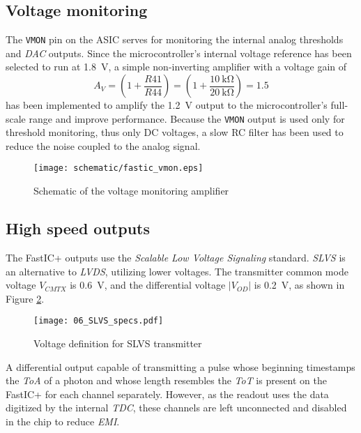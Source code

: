 \subsection{Voltage monitoring}
%
The \verb|VMON| pin on the ASIC serves for monitoring the internal analog thresholds and \emph{DAC} outputs. Since the microcontroller's internal voltage reference has been selected to run at \SI{1.8}{\volt}, a simple non-inverting amplifier with a voltage gain of
%
\begin{equation}
    A_V = \left( 1 + \frac{R41}{R44}\right) = \left( 1 + \frac{\SI{10}{\kilo\ohm}}{\SI{20}{\kilo\ohm}}\right) = 1.5
\end{equation}
%
has been implemented to amplify the \SI{1.2}{\volt} output to the microcontroller's full-scale range and improve performance. Because the \verb|VMON| output is used only for threshold monitoring, thus only DC voltages, a slow RC filter has been used to reduce the noise coupled to the analog signal.
%
\FloatBarrier
\begin{figure}[htp!]
    \centering
    \texttt{[image: schematic/fastic\_vmon.eps]}
    \caption{Schematic of the voltage monitoring amplifier}
    \label{fig:fastic_vmon}
\end{figure}
\FloatBarrier
%
\subsection{High speed outputs}
%
The FastIC+ outputs use the \emph{Scalable Low Voltage Signaling} standard. \emph{SLVS} is an alternative to \emph{LVDS}, utilizing lower voltages. The transmitter common mode voltage $V_{CMTX}$ is \SI{0.6}{\volt}, and the differential voltage $|V_{OD}|$ is \SI{0.2}{\volt}, as shown in Figure \ref{fig:slvs_voltages}.

\begin{figure}[ht]
	\begin{center}
		\texttt{[image: 06\_SLVS\_specs.pdf]}
	\end{center}
	\vspace{-5mm}
	\caption{Voltage definition for SLVS transmitter}
	\label{fig:slvs_voltages}
\end{figure}

A differential output capable of transmitting a pulse whose beginning timestamps the \emph{ToA} of a photon and whose length resembles the \emph{ToT} is present on the FastIC+ for each channel separately. However, as the readout uses the data digitized by the internal \emph{TDC}, these channels are left unconnected and disabled in the chip to reduce \emph{EMI}.

